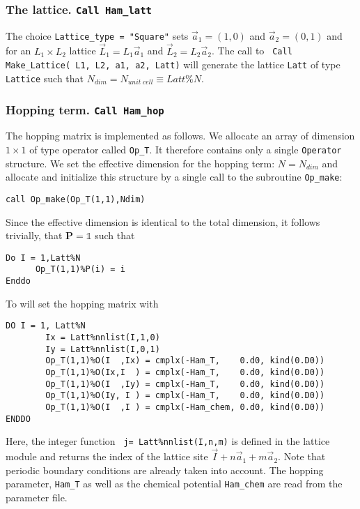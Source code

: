 \subsubsection{The lattice.   \texttt{Call Ham\_latt} }
The choice \texttt{Lattice\_type = "Square"} sets $\vec{a}_1 =  (1,0) $ and $\vec{a}_2 =  (0,1) $  and for an $L_1 \times L_2$  lattice  $\vec{L}_1 = L_1 \vec{a}_1$ and  $\vec{L}_2 = L_2 \vec{a}_2$.     The call to  \texttt{ Call Make\_Lattice( L1, L2, a1,  a2, Latt)} will generate the lattice   \texttt{Latt} of type \texttt{Lattice} such that  $N_{dim}   =N_{unit\;cell} \equiv Latt\%N$. 


\subsubsection{Hopping term. \texttt{Call Ham\_hop}}
The hopping matrix is implemented as follows. 
We allocate an array of dimension $1\times 1$ of type operator  called \texttt{Op\_T}. It therefore contains only a single \texttt{Operator} structure.
We set the effective dimension for the hopping term: $N=N_{dim}$ and  allocate and initialize this structure by a single call to the subroutine \texttt{Op\_make}: 
\begin{verbatim}
call Op_make(Op_T(1,1),Ndim)
\end{verbatim}

Since the effective dimension is identical to the total dimension, it follows trivially, that ${\bm P}=\mathds{1}$   such that   
 \begin{verbatim}
Do I = 1,Latt%N
      Op_T(1,1)%P(i) = i
Enddo
\end{verbatim}
To will set the hopping matrix  with 
\begin{verbatim}
DO I = 1, Latt%N
        Ix = Latt%nnlist(I,1,0)
        Iy = Latt%nnlist(I,0,1)
        Op_T(1,1)%O(I  ,Ix) = cmplx(-Ham_T,    0.d0, kind(0.D0))
        Op_T(1,1)%O(Ix,I  ) = cmplx(-Ham_T,    0.d0, kind(0.D0))
        Op_T(1,1)%O(I  ,Iy) = cmplx(-Ham_T,    0.d0, kind(0.D0))
        Op_T(1,1)%O(Iy, I ) = cmplx(-Ham_T,    0.d0, kind(0.D0))
        Op_T(1,1)%O(I  ,I ) = cmplx(-Ham_chem, 0.d0, kind(0.D0))
ENDDO
 \end{verbatim}
Here,    the integer  function \texttt{  j=  Latt\%nnlist(I,n,m)}   is defined in the lattice module and returns the index of the lattice site $ \vec{I} +  n \vec{a}_1 +  m \vec{a}_2$. Note that periodic boundary conditions are 
already taken into account.  The hopping parameter, \texttt{Ham\_T} as well as the chemical potential \texttt{Ham\_chem} are read from the parameter file.  


